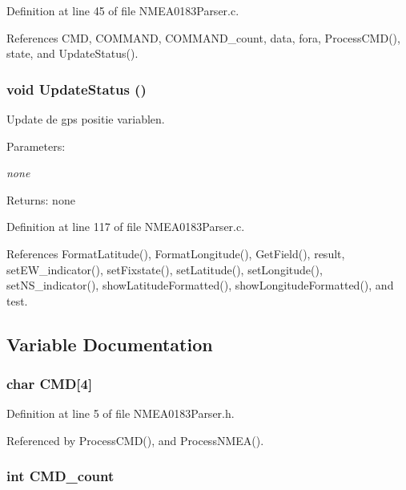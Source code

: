 Definition at line 45 of file NMEA0183Parser.c.

References CMD, COMMAND, COMMAND\_\-count, data, fora, ProcessCMD(), state, and UpdateStatus().
\subsubsection{\setlength{\rightskip}{0pt plus 5cm}void UpdateStatus ()}\label{_n_m_e_a0183_parser_8h_c945854d98af9a04ad3bdcfa4048394f}


Update de gps positie variablen. 

\begin{Desc}
\item[Parameters:]
\begin{description}
\item[{\em none}]\end{description}
\end{Desc}
\begin{Desc}
\item[Returns:]none \end{Desc}


Definition at line 117 of file NMEA0183Parser.c.

References FormatLatitude(), FormatLongitude(), GetField(), result, setEW\_\-indicator(), setFixstate(), setLatitude(), setLongitude(), setNS\_\-indicator(), showLatitudeFormatted(), showLongitudeFormatted(), and test.

\subsection{Variable Documentation}
\subsubsection{\setlength{\rightskip}{0pt plus 5cm}char {\bf CMD}[4]}\label{_n_m_e_a0183_parser_8h_777250fc0925c7e20faa58eb797a7dc8}




Definition at line 5 of file NMEA0183Parser.h.

Referenced by ProcessCMD(), and ProcessNMEA().
\subsubsection{\setlength{\rightskip}{0pt plus 5cm}int {\bf CMD\_\-count}}\label{_n_m_e_a0183_parser_8h_1e9ee9946103d34e073f102fd627edc2}




